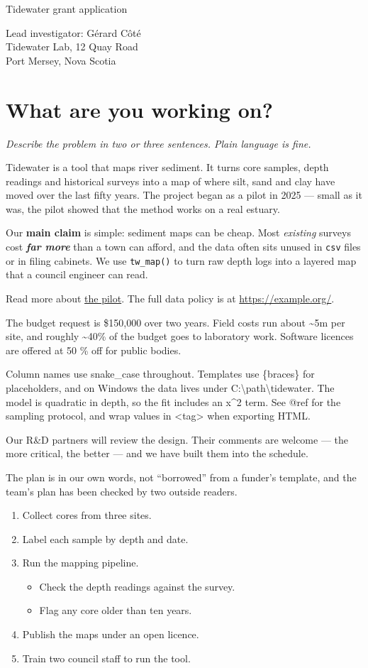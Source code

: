 Tidewater grant application

Lead investigator: Gérard Côté\\
Tidewater Lab, 12 Quay Road\\
Port Mersey, Nova Scotia

\section{What are you working on?}

\emph{Describe the problem in two or three sentences. Plain language is fine.}

Tidewater is a tool that maps river sediment. It turns core samples, depth readings and historical surveys into a map of where silt, sand and clay have moved over the last fifty years. The project began as a pilot in 2025 — small as it was, the pilot showed that the method works on a real estuary.

Our \textbf{main claim} is simple: sediment maps can be cheap. Most \emph{existing} surveys cost \textbf{\emph{far more}} than a town can afford, and the data often sits unused in \texttt{csv} files or in filing cabinets. We use \texttt{tw\_map()} to turn raw depth logs into a layered map that a council engineer can read.

Read more about \href{https://example.org/pilot}{the pilot}. The full data policy is at \url{https://example.org/}.

The budget request is \$150,000 over two years. Field costs run about \textasciitilde{}5m per site, and roughly \textasciitilde{}40\% of the budget goes to laboratory work. Software licences are offered at 50 \% off for public bodies.

Column names use snake\_case throughout. Templates use \{braces\} for placeholders, and on Windows the data lives under C:\textbackslash{}path\textbackslash{}tidewater. The model is quadratic in depth, so the fit includes an x\textasciicircum{}2 term. See @ref for the sampling protocol, and wrap values in <tag> when exporting HTML.

Our R\&D partners will review the design. Their comments are welcome — the more critical, the better — and we have built them into the schedule.

The plan is in our own words, not “borrowed” from a funder’s template, and the team’s plan has been checked by two outside readers.

\begin{enumerate}
  \item Collect cores from three sites.
  \item Label each sample by depth and date.
  \item Run the mapping pipeline.
  \begin{itemize}
    \item Check the depth readings against the survey.
    \item Flag any core older than ten years.
  \end{itemize}
  \item Publish the maps under an open licence.
  \item Train two council staff to run the tool.
\end{enumerate}

